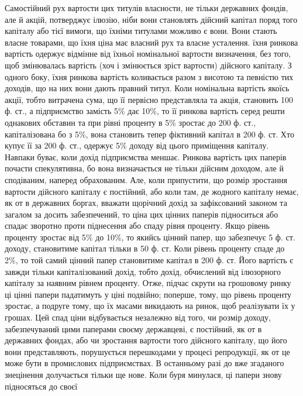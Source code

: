 
Самостійний рух вартости цих титулів власности, не тільки державних
фондів, але й акцій, потверджує ілюзію, ніби вони становлять дійсний капітал
поряд того капіталу або тієї вимоги, що їхніми титулами можливо є вони.
Вони стають власне товарами, що їхня ціна має власний рух та власне усталення.
їхня ринкова вартість одержує відмінне від їхньої номінальної вартости
визначення, без того, щоб змінювалась вартість (хоч і змінюється зріст вартости)
дійсного капіталу. З одного боку, їхня ринкова вартість коливається разом з
висотою та певністю тих доходів, що на них вони дають правний титул. Коли
номінальна вартість якоїсь акції, тобто витрачена сума, що її первісно представляла
та акція, становить 100 ф. ст., а підприємство замість 5\% дає 10\%,
то її ринкова вартість серед решти однакових обставин та при рівні проценту
в 5\% зростає до 200 ф. ст., капіталізована бо з 5\%, вона становить тепер фіктивний
капітал в 200 ф. ст. Хто купує її за 200 ф. ст., одержує 5\% доходу
від цього приміщення капіталу. Навпаки буває, коли дохід підприємства меншає.
Ринкова вартість цих паперів почасти спекулятивна, бо вона визначається не
тільки дійсним доходом, але й сподіваним, наперед обрахованим. Але, коли припустити,
що розмір зростання вартости дійсного капіталу є постійний, або коли там,
де жодного капіталу немає, як от в державних боргах, вважати щорічний дохід
за зафіксований законом та загалом за досить забезпечений, то ціна цих цінних
паперів підноситься або спадає зворотно проти піднесення або спаду
рівня проценту. Якщо рівень проценту зростає від 5\% до 10\%, то якийсь
цінний папер, що забезпечує 5 ф. ст. доходу, становитиме капітал тільки
в 50 ф. ст. Коли рівень проценту спаде до 2\%, то той самий цінний
папер становитиме капітал в 200 ф. ст. Його вартість є завжди тільки капіталізований
дохід, тобто дохід, обчислений від ілюзорного капіталу за наявним
рівнем проценту. Отже, підчас скрути на грошовому ринку ці цінні папери
падатимуть у ціні подвійно; поперше, тому, що рівень проценту зростає, а подруге
тому, що їх масами викидають на ринок, щоб реалізувати їх у грошах.
Цей спад ціни відбувається незалежно від того, чи розмір доходу, забезпечуваний
цими паперами своєму державцеві, є постійний, як от в державних фондах,
або чи зростання вартости того дійсного капіталу, що його вони представляють,
порушується перешкодами у процесі репродукції, як от це може бути в промислових
підприємствах. В останньому разі до вже згаданого знецінення долучається
тільки ще нове. Коли буря минулася, ці папери знову підносяться до своєї
